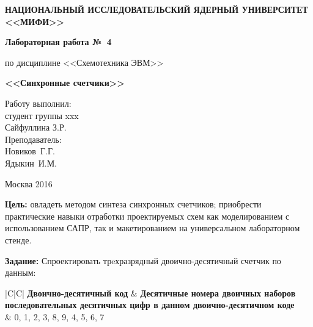 \documentclass[a4paper,12pt]{article}
\begin{document}

\thispagestyle{empty}
\begin{center}	
	\textbf{НАЦИОНАЛЬНЫЙ ИССЛЕДОВАТЕЛЬСКИЙ ЯДЕРНЫЙ УНИВЕРСИТЕТ \\<<МИФИ>>}
\end{center}
\vspace{10ex}
\begin{center}
	\textbf{Лабораторная работа №~4}
	\vspace{1ex}

	по дисциплине <<Схемотехника ЭВМ>>
	\vspace{1ex}

	\textbf{<<Синхронные счетчики>>}
\end{center}
\vspace{8cm}
\begin{flushright}
	\noindent
	Работу выполнил:\\
	студент группы xxx\\
	Сайфуллина З.Р.\\
	\vspace{3ex}
	Преподаватель:\\
	Новиков~Г.Г.\\
	Ядыкин~И.М.\\
\end{flushright}
\begin{center}
	\vfill
	Москва 2016
\end{center}

\newpage
\textbf{Цель:} овладеть методом синтеза синхронных счетчиков; приобрести практические навыки отработки проектируемых схем как моделированием с использованием САПР, так и макетированием на универсальном лабораторном стенде.
\vspace{2ex}

\textbf{Задание:} Спроектировать трeхразрядный двоично-десятичный счетчик по данным:
\begin{table}[h!]
	\centering
		\begin{tabularx}{\textwidth}{|C|C|}
				\hline \textbf{Двоично-десятичный код} & \textbf{Десятичные номера двоичных наборов	последовательных десятичных цифр в данном двоично-десятичном коде} \\
				 	&	0, 1, 2, 3, 8, 9, 4, 5, 6, 7	\\
				\hline
		\end{tabularx}
\end{table}

\vspace{2ex}
\end{document}
